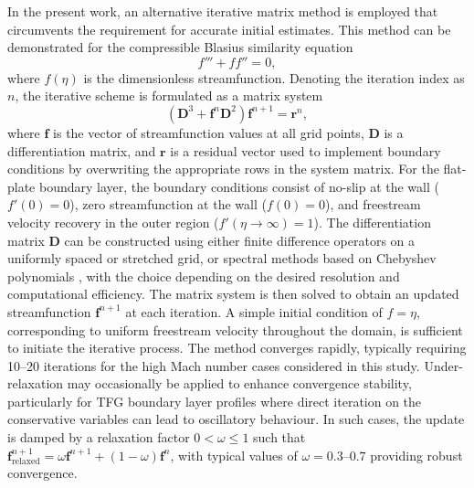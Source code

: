 In the present work, an alternative iterative matrix method is employed that circumvents the requirement for accurate initial estimates. This method can be demonstrated for the compressible Blasius similarity equation
\begin{equation}
    f''' + ff'' = 0,
\end{equation}
where $f(\eta)$ is the dimensionless streamfunction. Denoting the iteration index as $n$, the iterative scheme is formulated as a matrix system
\begin{equation}
    \left( \mathbf{D}^3 + \mathbf{f}^n \mathbf{D}^2 \right) \mathbf{f}^{n+1} = \mathbf{r}^n,
\end{equation}
where $\mathbf{f}$ is the vector of streamfunction values at all grid points, $\mathbf{D}$ is a differentiation matrix, and $\mathbf{r}$ is a residual vector used to implement boundary conditions by overwriting the appropriate rows in the system matrix. For the flat-plate boundary layer, the boundary conditions consist of no-slip at the wall ($f'(0) = 0$), zero streamfunction at the wall ($f(0) = 0$), and freestream velocity recovery in the outer region ($f'(\eta \to \infty) = 1$). The differentiation matrix $\mathbf{D}$ can be constructed using either finite difference operators on a uniformly spaced or stretched grid, or spectral methods based on Chebyshev polynomials \citep{Boyd2001,Trefethen2000}, with the choice depending on the desired resolution and computational efficiency. The matrix system is then solved to obtain an updated streamfunction $\mathbf{f}^{n+1}$ at each iteration. A simple initial condition of $f = \eta$, corresponding to uniform freestream velocity throughout the domain, is sufficient to initiate the iterative process. The method converges rapidly, typically requiring 10--20 iterations for the high Mach number cases considered in this study. Under-relaxation may occasionally be applied to enhance convergence stability, particularly for \gls{TFG} boundary layer profiles where direct iteration on the conservative variables can lead to oscillatory behaviour. In such cases, the update is damped by a relaxation factor $0 < \omega \leq 1$ such that $\mathbf{f}^{n+1}_{\text{relaxed}} = \omega \mathbf{f}^{n+1} + (1-\omega)\mathbf{f}^{n}$, with typical values of $\omega = 0.3$--$0.7$ providing robust convergence.


